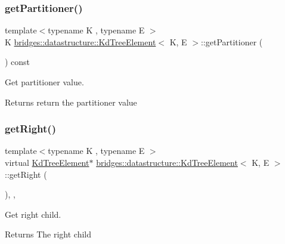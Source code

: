 \subsubsection{\texorpdfstring{get\+Partitioner()}{getPartitioner()}}
{\footnotesize\ttfamily template$<$typename K , typename E $>$ \\
K \hyperlink{classbridges_1_1datastructure_1_1_kd_tree_element}{bridges\+::datastructure\+::\+Kd\+Tree\+Element}$<$ K, E $>$\+::get\+Partitioner (\begin{DoxyParamCaption}{ }\end{DoxyParamCaption}) const\hspace{0.3cm}{\ttfamily [inline]}}



Get partitioner value. 

\begin{DoxyReturn}{Returns}
return the partitioner value 
\end{DoxyReturn}
\mbox{\label{classbridges_1_1datastructure_1_1_kd_tree_element_a366e3b0987169220d3a145043be2373d}} 
\subsubsection{\texorpdfstring{get\+Right()}{getRight()}\hspace{0.1cm}{\footnotesize\ttfamily [1/2]}}
{\footnotesize\ttfamily template$<$typename K , typename E $>$ \\
virtual \hyperlink{classbridges_1_1datastructure_1_1_kd_tree_element}{Kd\+Tree\+Element}$\ast$ \hyperlink{classbridges_1_1datastructure_1_1_kd_tree_element}{bridges\+::datastructure\+::\+Kd\+Tree\+Element}$<$ K, E $>$\+::get\+Right (\begin{DoxyParamCaption}{ }\end{DoxyParamCaption})\hspace{0.3cm}{\ttfamily [inline]}, {\ttfamily [override]}, {\ttfamily [virtual]}}



Get right child. 

\begin{DoxyReturn}{Returns}
The right child 
\end{DoxyReturn}


